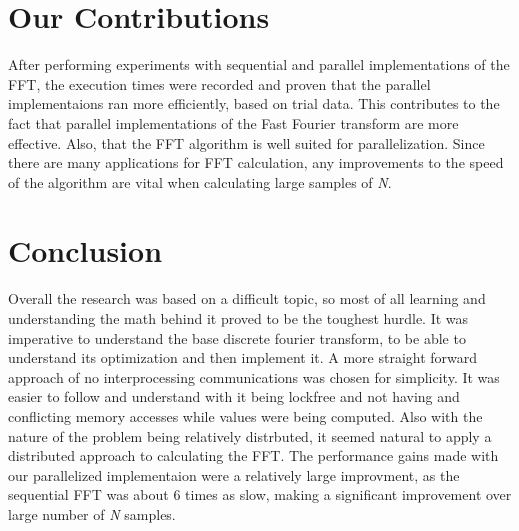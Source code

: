 \documentclass[journal]{IEEEtran}
\begin{document}
\section{Our Contributions}
	\par{
		After performing experiments with sequential and parallel implementations of the FFT, the execution times were 
		recorded and proven that the parallel implementaions ran more efficiently, based on trial data. This contributes to the fact 
		that parallel implementations of the Fast Fourier transform are more effective. Also, that the FFT algorithm 
		is well suited for parallelization. Since there are many applications for FFT calculation, any improvements to the speed 
		of the algorithm are vital when calculating large samples of \textit{N}.
	}
\section{Conclusion}
	\par{
		Overall the research was based on a difficult topic, so most of all learning and understanding the 
		math behind it proved to be the toughest hurdle. It was imperative to understand the base discrete 
		fourier transform, to be able to understand its optimization and then implement it. A more straight 
		forward approach of no interprocessing communications was chosen for simplicity. It was easier to 
		follow and understand with it being lockfree and not having and conflicting memory accesses while 
		values were being computed. Also with the nature of the problem being relatively distrbuted, it 
		seemed natural to apply a distributed approach to calculating the FFT. The performance gains made 
		with our parallelized implementaion were a relatively large improvment, as the sequential FFT was 
		about 6 times as slow, making a significant improvement over large number of \textit{N} samples.
	}

\medskip


\end{document}
